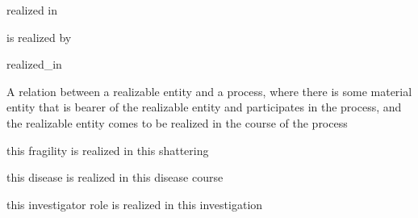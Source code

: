 \documentclass[letterpaper,10pt,english]{sphinxmanual}
\begin{document}
\begin{sphinxShadowBox}

\sphinxAtStartPar
realized in
\end{sphinxShadowBox}

\begin{sphinxShadowBox}

\sphinxAtStartPar
is realized by

\sphinxAtStartPar
realized\_in
\end{sphinxShadowBox}

\begin{sphinxShadowBox}

\sphinxAtStartPar
{}
\end{sphinxShadowBox}

\begin{sphinxShadowBox}

\sphinxAtStartPar
A relation between a realizable entity and a process, where there is some material entity that is bearer of the realizable entity and participates in the process, and the realizable entity comes to be realized in the course of the process
\end{sphinxShadowBox}

\begin{sphinxShadowBox}

\sphinxAtStartPar
this fragility is realized in this shattering

\sphinxAtStartPar
this disease is realized in this disease course

\sphinxAtStartPar
this investigator role is realized in this investigation
\end{sphinxShadowBox}

\begin{sphinxShadowBox}

\sphinxAtStartPar
{}
\end{sphinxShadowBox}
\begin{quote}

\ignorespaces \end{quote}
\end{document}
